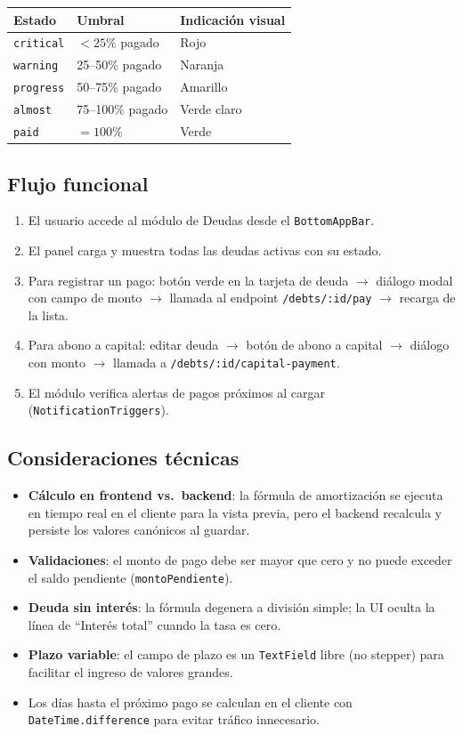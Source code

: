 \documentclass[12pt, letterpaper]{article}
\newcommand{\endpoint}[1]{\texttt{\small\color{azulipn}#1}}
\newcommand{\campo}[1]{\texttt{#1}}
\begin{document}
\begin{tabular}{llp{6cm}}
  \toprule
  \textbf{Estado} & \textbf{Umbral} & \textbf{Indicación visual} \\
  \midrule
  \campo{critical} & $< 25\%$ pagado    & Rojo \\
  \campo{warning}  & 25--50\% pagado    & Naranja \\
  \campo{progress} & 50--75\% pagado    & Amarillo \\
  \campo{almost}   & 75--100\% pagado   & Verde claro \\
  \campo{paid}     & $= 100\%$          & Verde \\
  \bottomrule
\end{tabular}

\subsection{Flujo funcional}

\begin{enumerate}
  \item El usuario accede al módulo de Deudas desde el \campo{BottomAppBar}.
  \item El panel carga y muestra todas las deudas activas con su estado.
  \item Para registrar un pago: botón verde en la tarjeta de deuda $\to$
        diálogo modal con campo de monto $\to$ llamada al endpoint
        \endpoint{/debts/:id/pay} $\to$ recarga de la lista.
  \item Para abono a capital: editar deuda $\to$ botón de abono a capital
        $\to$ diálogo con monto $\to$ llamada a
        \endpoint{/debts/:id/capital-payment}.
  \item El módulo verifica alertas de pagos próximos al cargar
        (\campo{NotificationTriggers}).
\end{enumerate}

\subsection{Consideraciones técnicas}

\begin{itemize}
  \item \textbf{Cálculo en frontend vs.\ backend}: la fórmula de amortización
        se ejecuta en tiempo real en el cliente para la vista previa, pero el
        backend recalcula y persiste los valores canónicos al guardar.
  \item \textbf{Validaciones}: el monto de pago debe ser mayor que cero y
        no puede exceder el saldo pendiente (\campo{montoPendiente}).
  \item \textbf{Deuda sin interés}: la fórmula degenera a división simple;
        la UI oculta la línea de ``Interés total'' cuando la tasa es cero.
  \item \textbf{Plazo variable}: el campo de plazo es un \campo{TextField}
        libre (no stepper) para facilitar el ingreso de valores grandes.
  \item Los días hasta el próximo pago se calculan en el cliente con
        \campo{DateTime.difference} para evitar tráfico innecesario.
\end{itemize}
\end{document}

